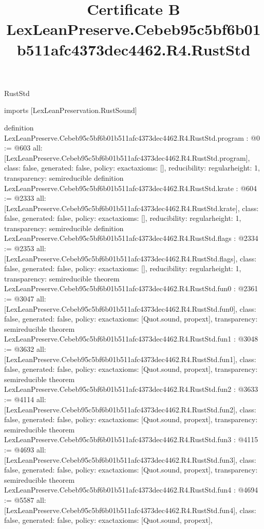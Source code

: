 \begin{lexlean}{RustStd}
\title{Certificate B LexLeanPreserve.Cebeb95c5bf6b01b511afc4373dec4462.R4.RustStd}
\begin{coremodule}
imports [LexLeanPreservation.RustSound]

definition LexLeanPreserve.Cebeb95c5bf6b01b511afc4373dec4462.R4.RustStd.program : @0 := @603 {
  all: [LexLeanPreserve.Cebeb95c5bf6b01b511afc4373dec4462.R4.RustStd.program],
  class: false,
  generated: false,
  policy: exact{axioms: []},
  reducibility: regular{height: 1},
  transparency: semireducible
}
definition LexLeanPreserve.Cebeb95c5bf6b01b511afc4373dec4462.R4.RustStd.krate : @604 := @2333 {
  all: [LexLeanPreserve.Cebeb95c5bf6b01b511afc4373dec4462.R4.RustStd.krate],
  class: false,
  generated: false,
  policy: exact{axioms: []},
  reducibility: regular{height: 1},
  transparency: semireducible
}
definition LexLeanPreserve.Cebeb95c5bf6b01b511afc4373dec4462.R4.RustStd.flags : @2334 := @2353 {
  all: [LexLeanPreserve.Cebeb95c5bf6b01b511afc4373dec4462.R4.RustStd.flags],
  class: false,
  generated: false,
  policy: exact{axioms: []},
  reducibility: regular{height: 1},
  transparency: semireducible
}
theorem LexLeanPreserve.Cebeb95c5bf6b01b511afc4373dec4462.R4.RustStd.fun0 : @2361 := @3047 {
  all: [LexLeanPreserve.Cebeb95c5bf6b01b511afc4373dec4462.R4.RustStd.fun0],
  class: false,
  generated: false,
  policy: exact{axioms: [Quot.sound, propext]},
  transparency: semireducible
}
theorem LexLeanPreserve.Cebeb95c5bf6b01b511afc4373dec4462.R4.RustStd.fun1 : @3048 := @3632 {
  all: [LexLeanPreserve.Cebeb95c5bf6b01b511afc4373dec4462.R4.RustStd.fun1],
  class: false,
  generated: false,
  policy: exact{axioms: [Quot.sound, propext]},
  transparency: semireducible
}
theorem LexLeanPreserve.Cebeb95c5bf6b01b511afc4373dec4462.R4.RustStd.fun2 : @3633 := @4114 {
  all: [LexLeanPreserve.Cebeb95c5bf6b01b511afc4373dec4462.R4.RustStd.fun2],
  class: false,
  generated: false,
  policy: exact{axioms: [Quot.sound, propext]},
  transparency: semireducible
}
theorem LexLeanPreserve.Cebeb95c5bf6b01b511afc4373dec4462.R4.RustStd.fun3 : @4115 := @4693 {
  all: [LexLeanPreserve.Cebeb95c5bf6b01b511afc4373dec4462.R4.RustStd.fun3],
  class: false,
  generated: false,
  policy: exact{axioms: [Quot.sound, propext]},
  transparency: semireducible
}
theorem LexLeanPreserve.Cebeb95c5bf6b01b511afc4373dec4462.R4.RustStd.fun4 : @4694 := @5587 {
  all: [LexLeanPreserve.Cebeb95c5bf6b01b511afc4373dec4462.R4.RustStd.fun4],
  class: false,
  generated: false,
  policy: exact{axioms: [Quot.sound, propext]},
}
\end{coremodule}
\end{lexlean}
